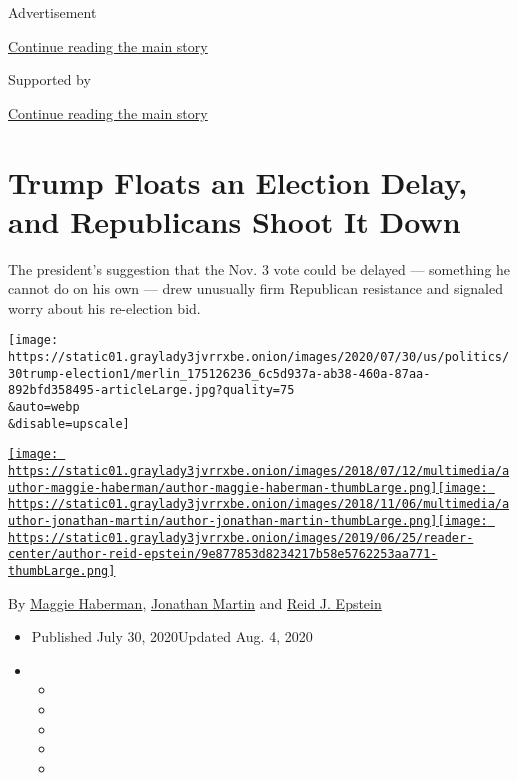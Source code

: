 Advertisement

\protect\hyperlink{after-top}{Continue reading the main story}

Supported by

\protect\hyperlink{after-sponsor}{Continue reading the main story}

\hypertarget{trump-floats-an-election-delay-and-republicans-shoot-it-down}{%
\section{Trump Floats an Election Delay, and Republicans Shoot It
Down}\label{trump-floats-an-election-delay-and-republicans-shoot-it-down}}

The president's suggestion that the Nov. 3 vote could be delayed ---
something he cannot do on his own --- drew unusually firm Republican
resistance and signaled worry about his re-election bid.

\texttt{[image: https://static01.graylady3jvrrxbe.onion/images/2020/07/30/us/politics/30trump-election1/merlin\_175126236\_6c5d937a-ab38-460a-87aa-892bfd358495-articleLarge.jpg?quality=75\\\&auto=webp\\\&disable=upscale]}

\href{https://www.nytimes3xbfgragh.onion/by/maggie-haberman}{\texttt{[image: https://static01.graylady3jvrrxbe.onion/images/2018/07/12/multimedia/author-maggie-haberman/author-maggie-haberman-thumbLarge.png]}}\href{https://www.nytimes3xbfgragh.onion/by/jonathan-martin}{\texttt{[image: https://static01.graylady3jvrrxbe.onion/images/2018/11/06/multimedia/author-jonathan-martin/author-jonathan-martin-thumbLarge.png]}}\href{https://www.nytimes3xbfgragh.onion/by/reid-j-epstein}{\texttt{[image: https://static01.graylady3jvrrxbe.onion/images/2019/06/25/reader-center/author-reid-epstein/9e877853d8234217b58e5762253aa771-thumbLarge.png]}}

By \href{https://www.nytimes3xbfgragh.onion/by/maggie-haberman}{Maggie
Haberman},
\href{https://www.nytimes3xbfgragh.onion/by/jonathan-martin}{Jonathan
Martin} and
\href{https://www.nytimes3xbfgragh.onion/by/reid-j-epstein}{Reid J.
Epstein}

\begin{itemize}
\item
  Published July 30, 2020Updated Aug. 4, 2020
\item
  \begin{itemize}
  \item
  \item
  \item
  \item
  \item
  \end{itemize}
\end{itemize}

